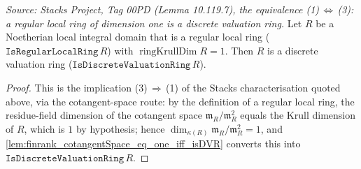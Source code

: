 \begin{lemma}

  \label{lem:regularLocal_dim_one_isDVR}
  \textit{Source: Stacks Project, Tag 00PD (Lemma 10.119.7), the
  equivalence (1)\,\(\Leftrightarrow\)\,(3): a regular local ring of
  dimension one is a discrete valuation ring.}
  Let \(R\) be a Noetherian local integral domain that is a regular local
  ring (\(\texttt{IsRegularLocalRing}\,R\)) with
  \(\operatorname{ringKrullDim} R = 1\). Then \(R\) is a discrete valuation
  ring (\(\texttt{IsDiscreteValuationRing}\,R\)).
\end{lemma}

\begin{proof}
  This is the implication (3)\,\(\Rightarrow\)\,(1) of the Stacks
  characterisation quoted above, via the cotangent-space route: by the
  definition of a regular local ring, the residue-field dimension of the
  cotangent space \(\mathfrak m_R / \mathfrak m_R^2\) equals the Krull
  dimension of \(R\), which is \(1\) by hypothesis; hence
  \(\dim_{\kappa(R)} \mathfrak m_R / \mathfrak m_R^2 = 1\), and
  \cref{lem:finrank_cotangentSpace_eq_one_iff_isDVR}
  converts this into \(\texttt{IsDiscreteValuationRing}\,R\).
\end{proof}

